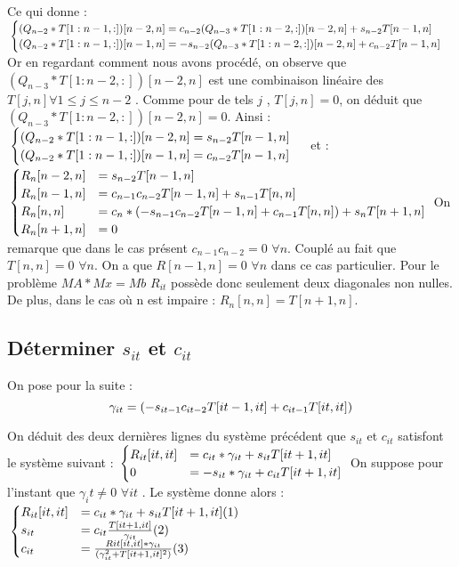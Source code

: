 \documentclass[12 pt]{article}
\begin{document}
Ce qui donne :$\\
\begin{cases}
  (Q_{n-2}*T[1:n-1,:])[n-2,n] = c_{n-2}(Q_{n-3}*T[1:n-2,:])[n-2,n] + s_{n-2}T[n-1,n] \\
  (Q_{n-2}*T[1:n-1,:])[n-1,n] = -s_{n-2}(Q_{n-3}*T[1:n-2,:])[n-2,n] + c_{n-2}T[n-1,n]
\end{cases} \\ $
Or en regardant comment nous avons procédé, on observe que $(Q_{n-3}*T[1:n-2,:])[n-2,n]$ est une combinaison linéaire des $T[j,n] \forall 1 \leq j \leq n-2$ . 
Comme pour de tels $j$ , $T[j,n] = 0$, on déduit que $(Q_{n-3}*T[1:n-2,:])[n-2,n] = 0$. Ainsi : $\\
\begin{cases}
  (Q_{n-2}*T[1:n-1,:])[n-2,n] = s_{n-2}T[n-1,n] \\
  (Q_{n-2}*T[1:n-1,:])[n-1,n] = c_{n-2}T[n-1,n]
\end{cases} \\ $ 
et : 
$ \\
\begin{cases}
  R_n[n-2,n] &= s_{n-2}T[n-1,n]  \\
  R_n[n-1,n] &= c_{n-1}c_{n-2}T[n-1,n] + s_{n-1}T[n,n]  \\
  R_n[n,n] &= c_n*(-s_{n-1}c_{n-2}T[n-1,n] + c_{n-1}T[n,n] ) + s_nT[n+1,n]  \\
  R_n[n+1,n] &= 0 
\end{cases} \\ $
On remarque que dans le cas présent $c_{n-1}c_{n-2} =0$ $\forall n$. Couplé au fait que $T[n,n]=0$ $\forall n$. On a que $R[n-1,n] = 0$ $\forall n$ dans ce cas particulier. 
Pour le problème $MA*Mx= Mb$ $R_{it}$ possède donc seulement deux diagonales non nulles.
 De plus, dans le cas où n est impaire :
$R_n[n,n] = T[n+1,n] $. 

\subsection*{Déterminer $s_{it}$ et $c_{it}$}

On pose pour la suite : 
\[ \gamma_{it} = (-s_{it-1}c_{it-2}T[it-1,it] + c_{it-1}T[it,it] )  \\ \]

On déduit des deux dernières lignes du système précédent que $s_{it}$ et $c_{it}$ satisfont le système suivant : $\\ 
\begin{cases}
  R_{it}[it,it] &= c_{it}*\gamma_{it} + s_{it}T[it+1,it]  \\
  0 &= -s_{it}*\gamma_{it} + c_{it}T[it+1,it]
\end{cases} \\ $
On suppose pour l'instant que $\gamma_it \neq 0 $ $\forall it$ . Le système donne alors : $\\
\begin{cases}
  R_{it}[it,it] &= c_{it}*\gamma_{it} + s_{it}T[it+1,it] (1) \\
  s_{it} &= c_{it}\frac{T[it+1,it]}{\gamma_{it}} (2) \\
  c_{it} &= \frac{R{it}[it,it]*\gamma_{it}}{( \gamma^2_{it} + T[it+1,it]^2 )}  (3)  
\end{cases} \\ $
\end{document}
